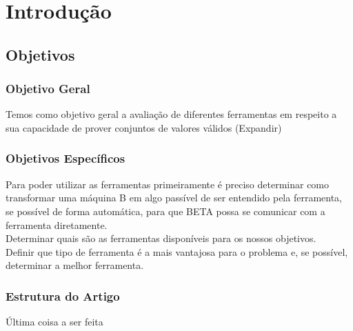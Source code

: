 \chapter{Introdução}\label{chp:LABEL_CHP_1}

\section{Objetivos}\label{sec:LABEL_CHP_1_SEC_A}

\subsection{Objetivo Geral}\label{sec:LABEL_CHP_1_SEC_B}
Temos como objetivo geral a avaliação de diferentes ferramentas em respeito a sua capacidade de prover conjuntos de valores válidos (Expandir)

\subsection{Objetivos Específicos}\label{sec:LABEL_CHP_1_SEC_C}
Para poder utilizar as ferramentas primeiramente é preciso determinar como transformar uma  máquina B em algo passível de ser entendido pela ferramenta, se possível de forma automática, para que BETA possa se comunicar com a ferramenta diretamente.\\
Determinar quais são as ferramentas disponíveis para os nossos objetivos.\\
Definir que tipo de ferramenta é a mais vantajosa para o problema e,
se possível, determinar a melhor ferramenta.

\subsection{Estrutura do Artigo}\label{sec:LABEL_CHP_1_SEC_D}
Última coisa a ser feita